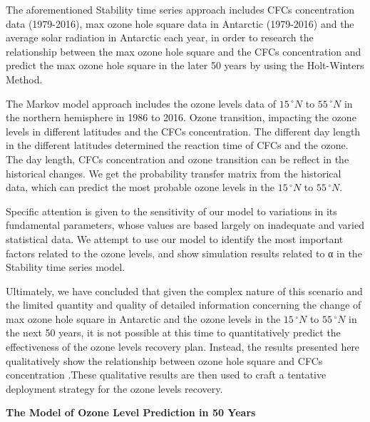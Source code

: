 \documentclass[12pt]{article}
\begin{document}
The aforementioned Stability time series approach includes CFCs concentration data (1979-2016), max ozone hole square data in Antarctic (1979-2016) and the average solar radiation in Antarctic each year, in order to research the relationship between the max ozone hole square and the CFCs concentration and predict the max ozone hole square in the later 50 years by using the Holt-Winters Method. 

The Markov model approach includes the ozone levels data of $15\,^{\circ}N$ to $55\,^{\circ}N$ in the northern hemisphere in 1986 to 2016. Ozone transition, impacting the ozone levels in different latitudes and the CFCs concentration. The different day length in the different latitudes determined the reaction time of CFCs and the ozone. The day length, CFCs concentration and ozone transition can be reflect in the historical changes. We get the probability transfer matrix from the historical data, which can predict the most probable ozone levels in the $15\,^{\circ}N$ to $55\,^{\circ}N$.

Specific attention is given to the sensitivity of our model to variations in its fundamental parameters, whose values are based largely on inadequate and varied statistical data. We attempt to use our model to identify the most important factors related to the ozone levels, and show simulation results related to α in the Stability time series model.

Ultimately, we have concluded that given the complex nature of this scenario and the limited quantity and quality of detailed information concerning the change of max ozone hole square in Antarctic and the ozone levels in the $15 \,^{\circ}N$ to $55\,^{\circ}N$ in the next 50 years, it is not possible at this time to quantitatively predict the effectiveness of the ozone levels recovery plan. Instead, the results presented here qualitatively show the relationship between ozone hole square and CFCs concentration .These qualitative results are then used to craft a tentative deployment strategy for the ozone levels recovery.
\newpage

\thispagestyle{empty}
\setcounter{page}{0}
{\begin{center}\Large \textbf{The Model of Ozone Level Prediction in 50 Years}\end{center}}
\tableofcontents                                                  %
\newpage                                                          %
\end{document}
